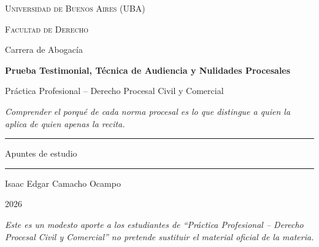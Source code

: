 \documentclass[12pt,oneside]{book}
\newcommand{\universidad}{Universidad de Buenos Aires (UBA)}
\newcommand{\facultad}{Facultad de Derecho}
\newcommand{\carrera}{Carrera de Abogacía}
\newcommand{\materia}{Práctica Profesional -- Derecho Procesal Civil y Comercial}
\newcommand{\titulo}{Prueba Testimonial, Técnica de Audiencia y Nulidades Procesales}
\newcommand{\autor}{Isaac Edgar Camacho Ocampo}
\newcommand{\anio}{2026}
\begin{document}
\begin{titlepage}
\thispagestyle{empty}

\begin{center}

\vspace*{1cm}

{\large \textsc{\universidad}}

\vspace{0.2cm}

{\large \textsc{\facultad}}

\vspace{0.2cm}

{\large \carrera}

\vspace{3cm}

{\Huge \textbf{\titulo}}

\vspace{1cm}

{\LARGE \materia}

\vspace{0.8cm}

\textit{Comprender el porqué de cada norma procesal es lo que distingue a quien la aplica de quien apenas la recita.}

\vspace{1.2cm}

\rule{0.70\textwidth}{0.5pt}

\vspace{0.5cm}

{\large Apuntes de estudio}

\vspace{0.5cm}

\rule{0.70\textwidth}{0.5pt}

\vfill

{\large \autor}

\vspace{0.3cm}

{\large \anio}

\end{center}

\vfill

\begin{flushleft}
\textit{Este es un modesto aporte a los estudiantes de ``Práctica Profesional -- Derecho Procesal Civil y Comercial'' no pretende sustituir el material oficial de la materia.}
\end{flushleft}

\end{titlepage}
\end{document}
